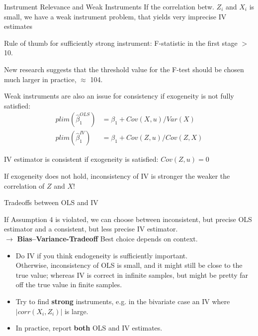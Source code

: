 \documentclass[11pt, aspectratio = 169]{beamer}
\begin{document}
\begin{frame}{Instrument Relevance and Weak Instruments}
    If the correlation betw. $Z_i$ and $X_i$ is small, we have a \alert{weak instrument} problem, that yields very imprecise IV estimates


    Rule of thumb for sufficiently strong instrument:  F-statistic in the first stage $>$ 10.

    New research suggests that the threshold value for the
F-test should be chosen much larger in practice, $\approx$ 104.
    \bigskip


\pause 
Weak instruments are also an issue for consistency if exogeneity is not fully satisfied:
\begin{align*}
    plim(\hat{\beta}_1^{OLS}) &= \beta_1 + Cov (X, u)/Var(X)   \\
plim(\hat{\beta}_1^{IV}) &= \beta_1 + Cov (Z, u)/Cov(Z,X)
\end{align*}

IV estimator is consistent if exogeneity is satisfied: $Cov(Z, u) = 0$

If exogeneity does not hold, inconsistency of IV is stronger the weaker the correlation of $Z$ and $X$!


\end{frame}

\begin{frame}{Tradeoffs between OLS and IV}

If Assumption 4 is violated, we can choose between inconsistent, but precise OLS estimator and a consistent, but less precise IV estimator. \\
$\rightarrow$ \textbf{\alert{Bias–Variance-Tradeoff}}
\pause
Best choice depends on context.
\begin{itemize}
    \item Do IV if you think endogeneity is sufficiently important. \\
    Otherwise, inconsistency of OLS is small, and it might still be close to the true value; whereas IV is correct in infinite samples, but might be pretty far off the true value in finite samples.
    \item Try to find \textbf{strong} instruments, e.g. in the bivariate case an IV where  $|corr(X_i, Z_i)|$ is large. \pause
    \item[$\rightarrow$] In practice, report \textbf{both} OLS and IV estimates. 
\end{itemize}
\end{frame}
\end{document}
